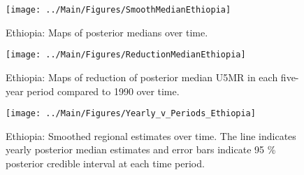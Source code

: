 \documentclass[12pt]{article}\usepackage[]{graphicx}\usepackage[]{color}
\newenvironment{knitrout}{}{} %
\begin{document}
\begin{knitrout}
\color{fgcolor}\begin{figure}[bht]

{\centering \texttt{[image: ../Main/Figures/SmoothMedianEthiopia]} 

}

\caption[Ethiopia]{Ethiopia: Maps of posterior medians over time.}\label{fig:unnamed-chunk-114}
\end{figure}


\end{knitrout}
\begin{knitrout}
\color{fgcolor}\begin{figure}[bht]

{\centering \texttt{[image: ../Main/Figures/ReductionMedianEthiopia]} 

}

\caption[Ethiopia]{Ethiopia: Maps of reduction of posterior median U5MR in each five-year period compared to 1990 over time.}\label{fig:unnamed-chunk-115}
\end{figure}


\end{knitrout}
\begin{knitrout}
\color{fgcolor}\begin{figure}[bht]

{\centering \texttt{[image: ../Main/Figures/Yearly\_v\_Periods\_Ethiopia]} 

}

\caption[Ethiopia]{Ethiopia: Smoothed regional estimates over time. The line indicates yearly posterior median estimates and error bars indicate 95 \% posterior credible interval at each time period.}\label{fig:unnamed-chunk-116}
\end{figure}


\end{knitrout}
\end{document}
